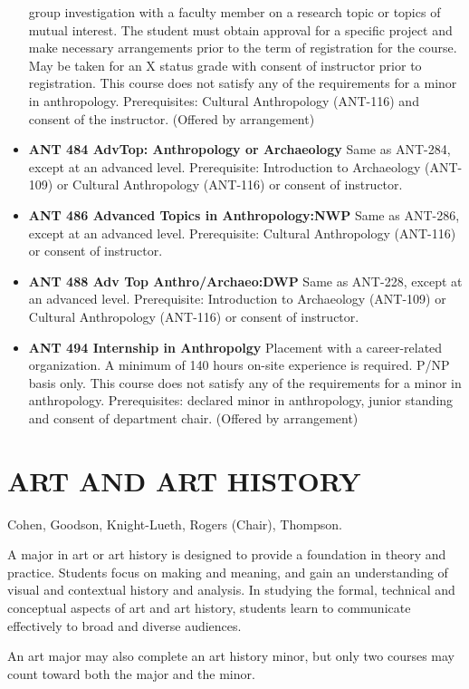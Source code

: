 \documentclass[
  letterpaper,
]{scrbook}
\begin{document}
\begin{itemize}
  group investigation with a faculty member on a research topic or
  topics of mutual interest. The student must obtain approval for a
  specific project and make necessary arrangements prior to the term of
  registration for the course. May be taken for an X status grade with
  consent of instructor prior to registration. This course does not
  satisfy any of the requirements for a minor in anthropology.
  Prerequisites: Cultural Anthropology (ANT-116) and consent of the
  instructor. (Offered by arrangement)
\item
  \textbf{ANT 484 AdvTop: Anthropology or Archaeology} Same as ANT-284,
  except at an advanced level. Prerequisite: Introduction to Archaeology
  (ANT-109) or Cultural Anthropology (ANT-116) or consent of instructor.
\item
  \textbf{ANT 486 Advanced Topics in Anthropology:NWP} Same as ANT-286,
  except at an advanced level. Prerequisite: Cultural Anthropology
  (ANT-116) or consent of instructor.
\item
  \textbf{ANT 488 Adv Top Anthro/Archaeo:DWP} Same as ANT-228, except at
  an advanced level. Prerequisite: Introduction to Archaeology (ANT-109)
  or Cultural Anthropology (ANT-116) or consent of instructor.
\item
  \textbf{ANT 494 Internship in Anthropolgy} Placement with a
  career-related organization. A minimum of 140 hours on-site experience
  is required. P/NP basis only. This course does not satisfy any of the
  requirements for a minor in anthropology. Prerequisites: declared
  minor in anthropology, junior standing and consent of department
  chair. (Offered by arrangement)
\end{itemize}

\section{ART AND ART HISTORY}\label{art-and-art-history}

Cohen, Goodson, Knight-Lueth, Rogers (Chair), Thompson.

A major in art or art history is designed to provide a foundation in
theory and practice. Students focus on making and meaning, and gain an
understanding of visual and contextual history and analysis. In studying
the formal, technical and conceptual aspects of art and art history,
students learn to communicate effectively to broad and diverse
audiences.

An art major may also complete an art history minor, but only two
courses may count toward both the major and the minor.
\end{document}
